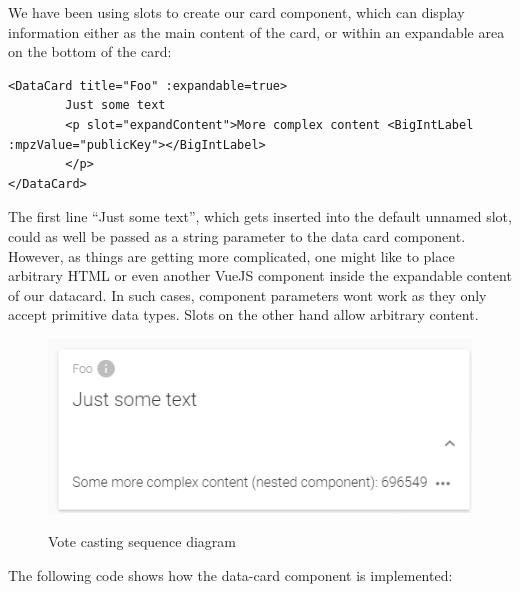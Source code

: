 We have been using slots to create our card component, which can display information either as the main content of the card, or within an expandable area on the bottom of the card:

\begin{verbatim} 
<DataCard title="Foo" :expandable=true>
		Just some text
		<p slot="expandContent">More complex content <BigIntLabel :mpzValue="publicKey"></BigIntLabel>
		</p>
</DataCard>
\end{verbatim}
The first line "`Just some text"', which gets inserted into the default unnamed slot, could as well be passed as a string parameter to the data card component. However, as things are getting more complicated, one might like to place arbitrary HTML or even another VueJS component inside the expandable content of our datacard. In such cases, component parameters wont work as they only accept primitive data types. Slots on the other hand allow arbitrary content.
\begin{figure}[h!]
\begin{center}
\includegraphics[scale=1.0]{assets/datacardexample.PNG}\\
\caption{Vote casting sequence diagram}
\end{center}
\end{figure}
The following code shows how the data-card component is implemented:

